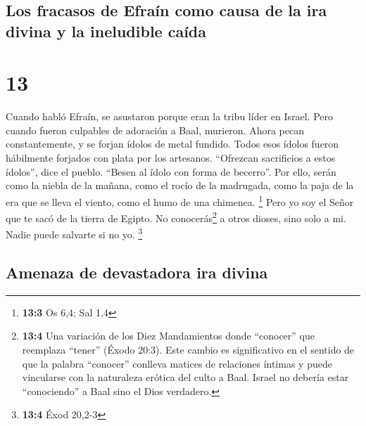 \hypertarget{los-fracasos-de-efrauxedn-como-causa-de-la-ira-divina-y-la-ineludible-cauxedda}{%
\subsection{Los fracasos de Efraín como causa de la ira divina y la
ineludible
caída}\label{los-fracasos-de-efrauxedn-como-causa-de-la-ira-divina-y-la-ineludible-cauxedda}}

\hypertarget{section-12}{%
\section{13}\label{section-12}}

 Cuando habló Efraín, se asustaron porque eran la tribu
líder en Israel. Pero cuando fueron culpables de adoración a Baal,
murieron.  Ahora pecan constantemente, y se forjan ídolos
de metal fundido. Todos esos ídolos fueron hábilmente forjados con plata
por los artesanos. ``Ofrezcan sacrificios a estos ídolos'', dice el
pueblo. ``Besen al ídolo con forma de becerro''.  Por
ello, serán como la niebla de la mañana, como el rocío de la madrugada,
como la paja de la era que se lleva el viento, como el humo de una
chimenea. \footnote{\textbf{13:3} Os 6,4; Sal 1,4}  Pero
yo soy el Señor que te sacó de la tierra de Egipto. No
conocerás\footnote{\textbf{13:4} Una variación de los Diez Mandamientos
  donde ``conocer'' que reemplaza ``tener'' (Éxodo 20:3). Este cambio es
  significativo en el sentido de que la palabra ``conocer'' conlleva
  matices de relaciones íntimas y puede vincularse con la naturaleza
  erótica del culto a Baal. Israel no debería estar ``conociendo'' a
  Baal sino el Dios verdadero.} a otros dioses, sino solo a mi. Nadie
puede salvarte si no yo. \footnote{\textbf{13:4} Éxod 20,2-3}

\hypertarget{amenaza-de-devastadora-ira-divina}{%
\subsection{Amenaza de devastadora ira
divina}\label{amenaza-de-devastadora-ira-divina}}

